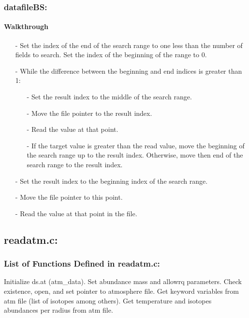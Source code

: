 \documentclass[letterpaper,12pt]{article}
\begin{document}
\subsubsection{datafileBS:}
\paragraph{Walkthrough}
\begin{enumerate}[leftmargin=10pt, noitemsep, parsep=0pt, topsep=0ex]
\item[-] Set the index of the end of the search range to one less than the number of fields to search. Set the index of the beginning of the range to 0.
\item[-] While the difference between the beginning and end indices is greater than 1:
\begin{enumerate}[leftmargin=10pt, noitemsep, parsep=0pt, topsep=0ex]
\item[-] Set the result index to the middle of the search range.
\item[-] Move the file pointer to the result index.
\item[-] Read the value at that point.
\item[-] If the target value is greater than the read value, move the beginning of the search range up to the result index. Otherwise, move then end of the search range to the result index.
\end{enumerate}
\item[-] Set the result index to the beginning index of the search range.
\item[-] Move the file pointer to this point.
\item[-] Read the value at that point in the file. 
\end{enumerate}

\newpage
\subsection{readatm.c:}
\subsubsection{List of Functions Defined in readatm.c:}
Initialize ds.at (atm\_data).  Set abundance mass and allowrq parameters.
Check existence, open, and set pointer to atmosphere file.
Get keyword variables from atm file (list of isotopes among others).
Get temperature and isotopes abundances per radius from atm file. \newline
\end{document}

